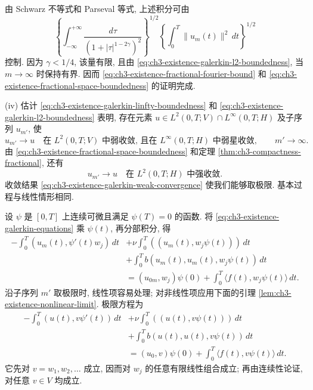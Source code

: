 \hypertarget{chapter-03-page-210}{}
由 Schwarz 不等式和 Parseval 等式, 上述积分可由
\[
\left\{\int_{-\infty}^{+\infty}
\frac{d\tau}{(1+|\tau|^{1-2\gamma})^2}\right\}^{1/2}
\left\{\int_0^T\lVert u_m(t)\rVert^2\,dt\right\}^{1/2}
\]
控制. 因为 $\gamma<1/4$, 该量有限, 且由 \eqref{eq:ch3-existence-galerkin-l2-boundedness}, 当 $m\to\infty$ 时保持有界. 因而 \eqref{eq:ch3-existence-fractional-fourier-bound} 和 \eqref{eq:ch3-existence-fractional-space-boundedness} 的证明完成.

(iv) 估计 \eqref{eq:ch3-existence-galerkin-linfty-boundedness} 和 \eqref{eq:ch3-existence-galerkin-l2-boundedness} 表明, 存在元素 $u\in L^2(0,T;V)\cap L^\infty(0,T;H)$ 及子序列 $u_{m'}$, 使
\begin{equation}
u_{m'}\longrightarrow u
\quad\text{在 }L^2(0,T;V)\text{ 中弱收敛, 且在 }L^\infty(0,T;H)\text{ 中弱星收敛},
\qquad m'\to\infty.
\label{eq:ch3-existence-galerkin-weak-convergence}
\end{equation}
由 \eqref{eq:ch3-existence-fractional-space-boundedness} 和定理 \ref{thm:ch3-compactness-fractional}, 还有
\begin{equation}
u_{m'}\longrightarrow u
\quad\text{在 }L^2(0,T;H)\text{ 中强收敛}.
\label{eq:ch3-existence-galerkin-strong-convergence}
\end{equation}
收敛结果 \eqref{eq:ch3-existence-galerkin-weak-convergence} 使我们能够取极限. 基本过程与线性情形相同.

设 $\psi$ 是 $[0,T]$ 上连续可微且满足 $\psi(T)=0$ 的函数. 将 \eqref{eq:ch3-existence-galerkin-equations} 乘 $\psi(t)$, 再分部积分, 得
\begin{equation}
\begin{aligned}
-\int_0^T(u_m(t),\psi'(t)w_j)\,dt
&+\nu\int_0^T((u_m(t),w_j\psi(t)))\,dt\\
&+\int_0^T b(u_m(t),u_m(t),w_j\psi(t))\,dt\\
&=(u_{0m},w_j)\psi(0)+\int_0^T\langle f(t),w_j\psi(t)\rangle\,dt.
\end{aligned}
\label{eq:ch3-existence-galerkin-integrated-equation}
\end{equation}
沿子序列 $m'$ 取极限时, 线性项容易处理; 对非线性项应用下面的引理 \ref{lem:ch3-existence-nonlinear-limit}. 极限方程为
\begin{equation}
\begin{aligned}
-\int_0^T(u(t),v\psi'(t))\,dt
&+\nu\int_0^T((u(t),v\psi(t)))\,dt\\
&+\int_0^T b(u(t),u(t),v\psi(t))\,dt\\
&=(u_0,v)\psi(0)+\int_0^T\langle f(t),v\psi(t)\rangle\,dt.
\end{aligned}
\label{eq:ch3-existence-limit-integrated-equation}
\end{equation}
它先对 $v=w_1,w_2,\ldots$ 成立, 因而对 $w_j$ 的任意有限线性组合成立; 再由连续性论证, 对任意 $v\in V$ 均成立.

